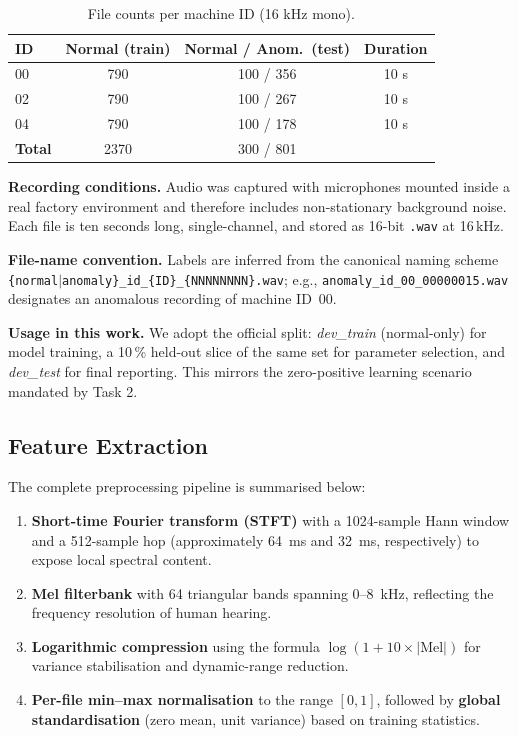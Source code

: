 \begin{table}[h]
\centering
\begin{tabular}{lccc}
\toprule
\textbf{ID} & \textbf{Normal (train)} & \textbf{Normal / Anom.\ (test)} & \textbf{Duration} \\
\midrule
00 & 790 & 100 / 356 & 10 s \\
02 & 790 & 100 / 267 & 10 s \\
04 & 790 & 100 / 178 & 10 s \\
\midrule
\textbf{Total} & 2370 & 300 / 801 & \\
\bottomrule
\end{tabular}
\caption{File counts per machine ID (16 kHz mono).}
\label{tab:id_split}
\end{table}

\noindent
\textbf{Recording conditions.}  
Audio was captured with microphones mounted inside a real factory
environment and therefore includes non-stationary background noise.
Each file is ten seconds long, single-channel, and stored as 16-bit
\texttt{.wav} at 16\,kHz.

\noindent
\textbf{File-name convention.}  
Labels are inferred from the canonical naming scheme
\texttt{\{normal$\vert$anomaly\}\_id\_\{ID\}\_\{NNNNNNNN\}.wav}; e.g.,
\texttt{anomaly\_id\_00\_00000015.wav} designates an anomalous
recording of machine ID~00.

\noindent
\textbf{Usage in this work.}  
We adopt the official split: \emph{dev\_train} (normal-only) for model
training, a 10\,\% held-out slice of the same set for parameter
selection, and \emph{dev\_test} for final reporting.  This mirrors the
zero-positive learning scenario mandated by Task 2.


\subsection{Feature Extraction}
The complete preprocessing pipeline is summarised below:

\begin{enumerate}
  \item \textbf{Short-time Fourier transform (STFT)} with a 1024-sample Hann window and a 512-sample hop (approximately 64~ms and 32~ms, respectively) to expose local spectral content.
  \item \textbf{Mel filterbank} with 64 triangular bands spanning 0–8~kHz, reflecting the frequency resolution of human hearing.
  \item \textbf{Logarithmic compression} using the formula \( \log(1 + 10 \times |\mathrm{Mel}|) \) for variance stabilisation and dynamic-range reduction.
  \item \textbf{Per-file min–max normalisation} to the range \([0, 1]\), followed by \textbf{global standardisation} (zero mean, unit variance) based on training statistics.
\end{enumerate}

